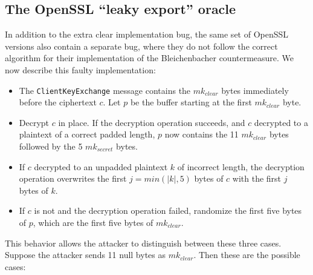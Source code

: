 
\subsection{The OpenSSL ``leaky export'' oracle}
In addition to the extra clear implementation bug, the same set of OpenSSL versions
also contain a separate bug, where they do not follow the correct algorithm
for their implementation of the Bleichenbacher countermeasure.
We now describe this faulty implementation:
\begin{itemize}
	\item The \ssltwo \texttt{ClientKeyExchange} message contains the
	$mk_{clear}$ bytes immediately before the ciphertext $c$. Let $p$
	be the buffer starting at the first $mk_{clear}$ byte.

	\item Decrypt $c$ in place. If the decryption operation succeeds,
	and $c$ decrypted to a plaintext of a correct padded length,
	$p$ now contains the 11 $mk_{clear}$ bytes followed by the 5
	$mk_{secret}$ bytes.

	\item If $c$ decrypted to an unpadded plaintext $k$ of incorrect length,
	the decryption operation overwrites the first $j = min(|k|, 5)$ bytes
	of $c$ with the first $j$ bytes of $k$.

	\item If $c$ is not \sslconform and the decryption operation failed,
	randomize the first five bytes of $p$, which are the first
	five bytes of $mk_{clear}$.
\end{itemize}

This behavior allows the attacker to distinguish between these three cases.
Suppose the attacker sends 11 null bytes as $mk_{clear}$.
Then these are the possible cases:

